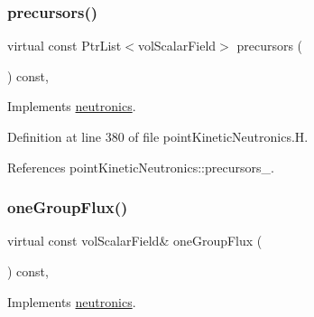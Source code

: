 \mbox{\label{classFoam_1_1pointKineticNeutronics_adff280398fa801b37b673a30623f5afe}} 
\subsubsection{\texorpdfstring{precursors()}{precursors()}}
{\footnotesize\ttfamily virtual const Ptr\+List$<$vol\+Scalar\+Field$>$ precursors (\begin{DoxyParamCaption}{ }\end{DoxyParamCaption}) const\hspace{0.3cm}{\ttfamily [inline]}, {\ttfamily [virtual]}}



Implements \hyperlink{classFoam_1_1neutronics_a9bc58c1b726592572ed3726d56ed41c4}{neutronics}.



Definition at line 380 of file point\+Kinetic\+Neutronics.\+H.



References point\+Kinetic\+Neutronics\+::precursors\+\_\+.

\mbox{\label{classFoam_1_1pointKineticNeutronics_a67faa978ebf3e97a9df21f1e37a68a8d}} 
\subsubsection{\texorpdfstring{one\+Group\+Flux()}{oneGroupFlux()}}
{\footnotesize\ttfamily virtual const vol\+Scalar\+Field\& one\+Group\+Flux (\begin{DoxyParamCaption}{ }\end{DoxyParamCaption}) const\hspace{0.3cm}{\ttfamily [inline]}, {\ttfamily [virtual]}}



Implements \hyperlink{classFoam_1_1neutronics_acc2b21a70318742930a68da6543ca259}{neutronics}.



